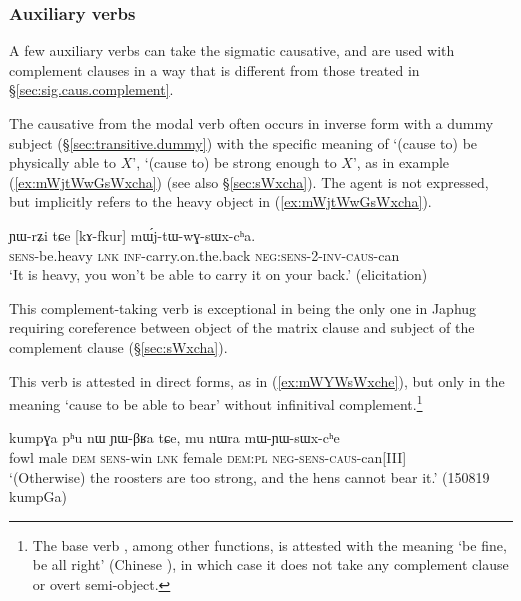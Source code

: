 \subsubsection{Auxiliary verbs} \label{sec:sig.caus.modal}
A few auxiliary verbs can take the sigmatic causative, and are used with complement clauses in a way that is different from those treated in §\ref{sec:sig.caus.complement}. 

The causative  from the modal verb  often occurs in inverse form with a dummy subject (§\ref{sec:transitive.dummy}) with the specific meaning of  `(cause to) be physically able to $X$', `(cause to) be strong enough to $X$', as in example (\ref{ex:mWjtWwGsWxcha}) (see also §\ref{sec:sWxcha}). The agent is not expressed, but implicitly refers to the heavy object in (\ref{ex:mWjtWwGsWxcha}).  

\begin{exe}
\ex \label{ex:mWjtWwGsWxcha}
\gll ɲɯ-rʑi tɕe [kɤ-fkur] mɯ́j-tɯ-wɣ-sɯx-cʰa. \\
\textsc{sens}-be.heavy \textsc{lnk}  \textsc{inf}-carry.on.the.back \textsc{neg}:\textsc{sens}-\textsc{2}-\textsc{inv}-\textsc{caus}-can \\
\glt `It is heavy, you won't be able to carry it on your back.' (elicitation)
\end{exe}	

 This com\-ple\-ment-taking verb is exceptional in being the only one in Japhug requiring coreference between object of the matrix clause and subject of the complement clause (§\ref{sec:sWxcha}).

This verb is attested in direct forms, as in (\ref{ex:mWYWsWxche}), but only in the meaning `cause to be able to bear' without infinitival complement.\footnote{The base verb , among other functions, is attested with the meaning `be fine, be all right' (Chinese ), in which case it does not take any complement clause or overt semi-object. }

\begin{exe}
\ex \label{ex:mWYWsWxche}
\gll kumpɣa pʰu nɯ ɲɯ-βʁa tɕe, mu nɯra mɯ-ɲɯ-sɯx-cʰe\\
fowl male \textsc{dem} \textsc{sens}-win \textsc{lnk} female \textsc{dem}:\textsc{pl} \textsc{neg}-\textsc{sens}-\textsc{caus}-can[III] \\
\glt `(Otherwise) the roosters are too strong, and the hens cannot bear it.' (150819 kumpGa)
\end{exe} 

